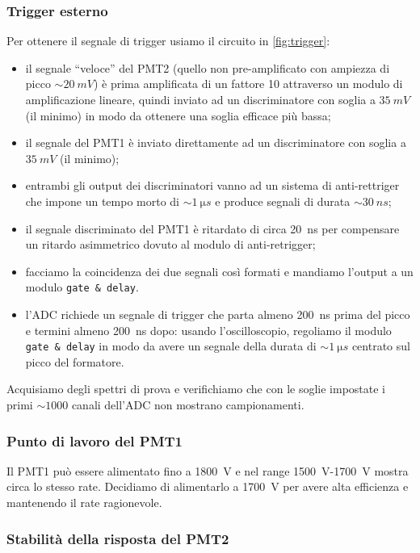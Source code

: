 \subsubsection{Trigger esterno}
Per ottenere il segnale di trigger usiamo il circuito in \autoref{fig:trigger}:
\begin{itemize}
	\item il segnale ``veloce'' del PMT2 (quello non pre-amplificato con ampiezza di picco $\sim\SI{20}{mV}$) è prima amplificata di un fattore 10 attraverso un modulo di amplificazione lineare, quindi inviato ad un discriminatore con soglia a $\SI{35}{mV}$ (il minimo) in modo da ottenere una soglia efficace più bassa;
	\item il segnale del PMT1 è inviato direttamente ad un discriminatore con soglia a $\SI{35}{mV}$ (il minimo);
	\item entrambi gli output dei discriminatori vanno ad un sistema di anti-rettriger che impone un tempo morto di $\sim\SI{1}{\micro s}$ e produce segnali di durata $\sim\SI{30}{ns}$;
	\item il segnale discriminato del PMT1 è ritardato di circa \SI{20}{ns} per compensare un ritardo asimmetrico dovuto al modulo di anti-retrigger;
	\item facciamo la coincidenza dei due segnali così formati e mandiamo l'output a un modulo \texttt{gate \& delay}.
	\item l'ADC richiede un segnale di trigger che parta almeno \SI{200}{ns} prima del picco e termini almeno \SI{200}{ns} dopo: usando l'oscilloscopio, regoliamo il modulo \texttt{gate \& delay} in modo da avere un segnale della durata di $\sim\SI{1}{\micro s}$ centrato sul picco del formatore.
\end{itemize}
Acquisiamo degli spettri di prova e verifichiamo che con le soglie impostate i primi $\sim1000$ canali dell'ADC non mostrano campionamenti.

\subsubsection{Punto di lavoro del PMT1}
Il PMT1 può essere alimentato fino a \SI{1800}{V} e nel range \SI{1500}{V}-\SI{1700}{V} mostra circa lo stesso rate. Decidiamo di alimentarlo a \SI{1700}{V} per avere alta efficienza e mantenendo il rate ragionevole.

\subsubsection{Stabilità della risposta del PMT2}

